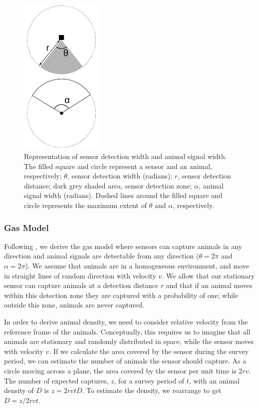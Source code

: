 \documentclass[a4paper,10pt,reqno,oneside]{amsart}
\begin{document}
\begin{figure}[t]
        \centering
	\includegraphics[width=4cm]{imgs/angleDefinitions.pdf}

\caption{Representation of sensor detection width and animal signal width. The filled square and circle represent a sensor and an animal, respectively; $\theta$, sensor detection width (radians); $r$, sensor detection distance; dark grey shaded area, sensor detection zone; $\alpha$, animal signal width (radians). Dashed lines around the filled square and circle represents the maximum extent of $\theta$ and $\alpha$, respectively.} 
\label{f:AngleDef}
\end{figure}



\subsubsection*{Gas Model}

Following \cite{yapp1956theory}, we derive the gas model where sensors can capture animals in any direction and animal signals are detectable from any direction ($ \theta =  2\pi$ and $ \alpha =  2\pi$). We assume that animals are in a homogeneous environment, and move in straight lines of random direction with velocity $v$. We allow that our stationary sensor can capture animals at a detection distance $r$ and that if an animal moves within this detection zone they are captured with a probability of one; while outside this zone, animals are never captured.

In order to derive animal density, we need to consider relative velocity from the reference frame of the animals. Conceptually, this requires us to imagine that all animals are stationary and randomly distributed in space, while the sensor moves with velocity $v$. If we calculate the area covered by the sensor during the survey period, we can estimate the number of animals the sensor should capture. As a circle moving across a plane, the area covered by the sensor per unit time is $2rv$. The number of expected captures, $z$, for a survey period of $t$, with an animal density of $D$ is $z = 2rvtD$. To estimate the density, we rearrange to get $D = z/2rvt$.
\end{document}
